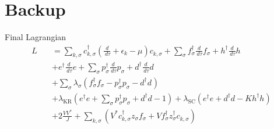\documentclass[13pt]{beamer}
\begin{document}
  \appendix

  \section{Backup}

  \begin{frame}{Final Lagrangian}
    \begin{align*}
    L \quad &= \sum_{k,\sigma} c^{\dagger}_{k,\sigma} \left( \frac{d}{\,d\tau} + \epsilon_k - \mu \right) c^{}_{k,\sigma} + \sum_{\sigma} f^{\dagger}_{\sigma} \frac{d}{\,d\tau} f^{}_{\sigma} + h^{\dagger} \frac{d}{\,d\tau}h \\
    &+ e^{\dagger} \frac{d}{\,d\tau} e  + \sum_{\sigma} p^{\dagger}_{\sigma} \frac{d}{\,d\tau} p^{}_{\sigma} + d^{\dagger} \frac{d}{\,d\tau} d \\
    &+ \sum_{\sigma} \lambda^{}_{\sigma} (f^{\dagger}_{\sigma} f^{}_{\sigma} - p^{\dagger}_{\sigma} p^{}_{\sigma} - d^{\dagger} d^{} ) \\
    &+ \lambda_{\text{KR}} ( e^{\dagger} e + \sum_{\sigma} p^{\dagger}_{\sigma} p^{}_{\sigma} + d^{\dagger} d - 1 ) + \lambda_{\text{SC}} ( e^{\dagger} e + d^{\dagger} d - K h^{\dagger} h) \\
    &+ 2 \frac{V V^{\ast}}{J} + \sum_{k,\sigma} \left( V^{\ast} c^{\dagger}_{k,\sigma} z^{}_{\sigma} f^{}_{\sigma} + V f^{\dagger}_{\sigma} z^{\dagger}_{\sigma} c^{}_{k,\sigma} \right)
    \end{align*}
  \end{frame}
\end{document}
